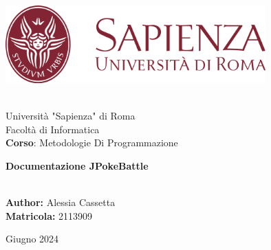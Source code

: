 \documentclass[12pt]{article}
\begin{document}
\begin{titlepage}
    \begin{center}

        \includegraphics[width=0.75\textwidth]{Uniroma1.svg.png}
        \par\medskip\noindent \\

        \large{Università "Sapienza" di Roma\\

            Facoltà di Informatica\\

            \textbf{Corso}: Metodologie Di Programmazione}\\

        \vfill

        \textbf {\Huge{Documentazione JPokeBattle}}
        \par\medskip\noindent \\
        \large{\textbf{Author: }Alessia Cassetta}\\

        \large{\textbf{Matricola: }2113909}


        \vfill

        Giugno 2024 %

    \end{center}
\end{titlepage}
\newpage
\tableofcontents
\newpage
\end{document}
